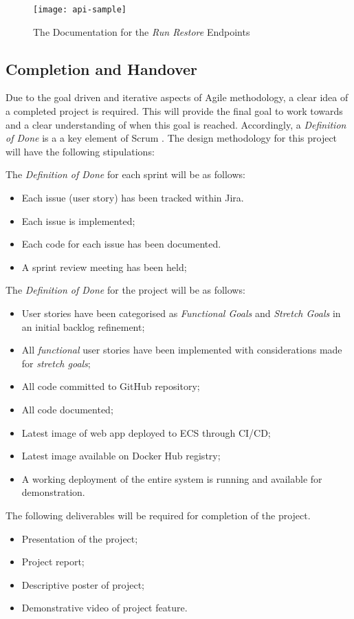   \begin{figure}[H]
    \setlength{\belowcaptionskip}{15pt plus 3pt minus 2pt}
    \caption{The Documentation for the \textit{Run Restore} Endpoints}
    \centering
    \texttt{[image: api-sample]}
    \label{fig:api-sample}
  \end{figure}
	
	\subsection{Completion and Handover}
	Due to the goal driven and iterative aspects of Agile methodology, a clear idea of a completed project is required. This will provide the final goal to work towards and a clear understanding of when this goal is reached. Accordingly, a \textit{Definition of Done} is a a key element of Scrum \citep{panchal}. The design methodology for this project will have the following stipulations:
	
	\noindent The \textit{Definition of Done} for each sprint will be as follows:
	
	\begin{itemize}
		\item Each issue (user story) has been tracked within Jira.
		\item Each issue is implemented;
		\item Each code for each issue has been documented.
		\item A sprint review meeting has been held;		
	\end{itemize}
	
	\noindent The \textit{Definition of Done} for the project  will be as follows:
	
	\begin{itemize}
		\item User stories have been categorised as \textit{Functional Goals} and \textit{Stretch Goals} in an initial backlog refinement;
		\item All \textit{functional} user stories have been implemented with considerations made for \textit{stretch goals};
		\item All code committed to GitHub repository;
		\item All code documented;
		\item Latest image of web app deployed to ECS through CI/CD;
		\item Latest image available on Docker Hub registry;
		\item A working deployment of the entire system is running and available for demonstration.
	\end{itemize}
	 
	 \noindent The following deliverables will be required for completion of the project. 
	 \begin{itemize}
	 	\item Presentation of the project;
	 	\item Project report;
	 	\item Descriptive poster of project;
	 	\item Demonstrative video of project feature.
	 \end{itemize}